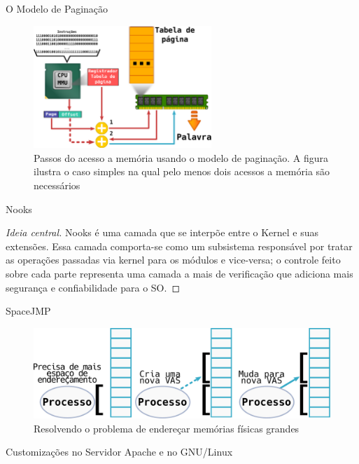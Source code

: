 \documentclass[xcolor={usenames,svgnames,dvipsnames},brazil,english,12pt,aspectratio=149]{beamer}
\begin{document}
\begin{frame}{O Modelo de Paginação}
  \begin{figure}[!h]
    \centering
    \includegraphics[width=0.6\textwidth]{paginacao_passos} 
    \caption*{Passos do acesso a memória usando o modelo de paginação. A figura ilustra o caso simples na qual pelo menos dois acessos a memória são necessários}
  \end{figure}
\end{frame}

\begin{frame}{Nooks}
  \begin{proof}[Ideia central]
Nooks é uma camada que se interpõe entre o Kernel e suas extensões. Essa camada
comporta-se como um subsistema responsável por tratar as operações passadas via
kernel para os módulos e vice-versa; o controle feito sobre cada parte
representa uma camada a mais de verificação que adiciona mais segurança e
confiabilidade para o SO.
  \end{proof}
\end{frame}

\begin{frame}{SpaceJMP}
  \begin{figure}[!h]
    \centering
    \includegraphics[width=.7\textwidth]{solve_huge_address_memory}
    \caption*{Resolvendo o problema de endereçar memórias físicas grandes}
  \end{figure}
\end{frame}

\begin{frame}{Customizações no Servidor Apache e no GNU/Linux}
  
\end{frame}
\end{document}
